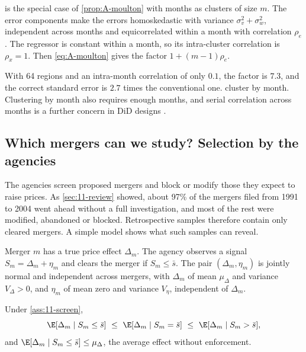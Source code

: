  is the special case of \cref{prop:A-moulton} with months as clusters of size $m$. The error
components make the errors homoskedastic with variance $\sigma_v^2+\sigma_w^2$, independent across months and
equicorrelated within a month with correlation $\rho_e$. The regressor is constant within a month, so its
intra-cluster correlation is $\rho_x=1$. Then \eqref{eq:A-moulton} gives the factor $1+(m-1)\rho_e$.

With 64 regions and an intra-month correlation of only $0.1$, the factor is $7.3$, and the correct standard error
is $2.7$ times the conventional one. \citet{AshenfelterHosken2010} cluster by month. Clustering by month also
requires enough months, and serial correlation across months is a further concern in DiD designs
\citep{BertrandDufloMullainathan2004}.

\subsection{Which mergers can we study? Selection by the agencies}\label{sec:11-retro-select}

The agencies screen proposed mergers and block or modify those they expect to raise prices. As
\cref{sec:11-review} showed, about 97\% of the mergers filed from 1991 to 2004 went ahead without a full
investigation, and most of the rest were modified, abandoned or blocked. Retrospective samples therefore contain
only cleared mergers. A simple model shows what such samples can reveal.

\begin{assumption}\label{ass:11-screen}
Merger $m$ has a true price effect $\Delta_m$. The agency observes a signal $S_m=\Delta_m+\eta_m$ and clears the
merger if $S_m\le\bar s$. The pair $(\Delta_m,\eta_m)$ is jointly normal and independent across mergers, with
$\Delta_m$ of mean $\mu_\Delta$ and variance $V_\Delta>0$, and $\eta_m$ of mean zero and variance $V_\eta$,
independent of $\Delta_m$.
\end{assumption}

\begin{proposition}\label{prop:11-select}
Under \cref{ass:11-screen},
\begin{equation*}
\E[\Delta_m\mid S_m\le\bar s]\ \le\ \E[\Delta_m\mid S_m=\bar s]\ \le\ \E[\Delta_m\mid S_m>\bar s],
\end{equation*}
and $\E[\Delta_m\mid S_m\le\bar s]\le\mu_\Delta$, the average effect without enforcement.
\end{proposition}

